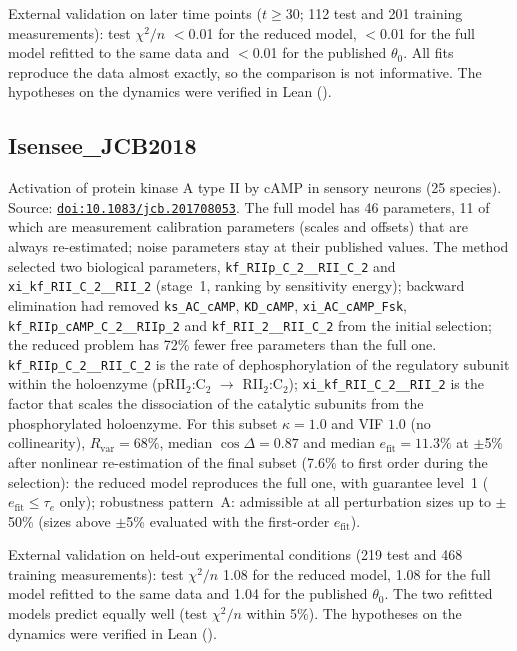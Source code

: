 External validation on later time points ($t\ge30$; 112 test and 201 training measurements): test $\chi^2/n$ $<$0.01 for the reduced model, $<$0.01 for the full model refitted to the same data and $<$0.01 for the published $\theta_0$. All fits reproduce the data almost exactly, so the comparison is not informative. The hypotheses on the dynamics were verified in Lean ().

\subsection*{Isensee\_JCB2018}

Activation of protein kinase A type II by cAMP in sensory neurons (25 species). Source: \href{https://doi.org/10.1083/jcb.201708053}{\nolinkurl{doi:10.1083/jcb.201708053}}. The full model has 46 parameters, 11 of which are measurement calibration parameters (scales and offsets) that are always re-estimated; noise parameters stay at their published values. The method selected two biological parameters, \texttt{kf\_RIIp\_C\_2\_\_RII\_C\_2} and \texttt{xi\_kf\_RII\_C\_2\_\_RII\_2} (stage~1, ranking by sensitivity energy); backward elimination had removed \texttt{ks\_AC\_cAMP}, \texttt{KD\_cAMP}, \texttt{xi\_AC\_cAMP\_Fsk}, \texttt{kf\_RIIp\_cAMP\_C\_2\_\_RIIp\_2} and \texttt{kf\_RII\_2\_\_RII\_C\_2} from the initial selection; the reduced problem has 72\% fewer free parameters than the full one. \texttt{kf\_RIIp\_C\_2\_\_RII\_C\_2} is the rate of dephosphorylation of the regulatory subunit within the holoenzyme (pRII$_2$:C$_2$ $\to$ RII$_2$:C$_2$); \texttt{xi\_kf\_RII\_C\_2\_\_RII\_2} is the factor that scales the dissociation of the catalytic subunits from the phosphorylated holoenzyme. For this subset $\kappa=1.0$ and VIF $1.0$ (no collinearity), $R_{\mathrm{var}}=68\%$, median $\cos\Delta=0.87$ and median $e_{\mathrm{fit}}=11.3\%$ at $\pm$5\% after nonlinear re-estimation of the final subset (7.6\% to first order during the selection): the reduced model reproduces the full one, with guarantee level~1 ($e_{\mathrm{fit}}\le\tau_e$ only); robustness pattern~A: admissible at all perturbation sizes up to $\pm$50\% (sizes above $\pm$5\% evaluated with the first-order $e_{\mathrm{fit}}$).

External validation on held-out experimental conditions (219 test and 468 training measurements): test $\chi^2/n$ 1.08 for the reduced model, 1.08 for the full model refitted to the same data and 1.04 for the published $\theta_0$. The two refitted models predict equally well (test $\chi^2/n$ within 5\%). The hypotheses on the dynamics were verified in Lean ().

